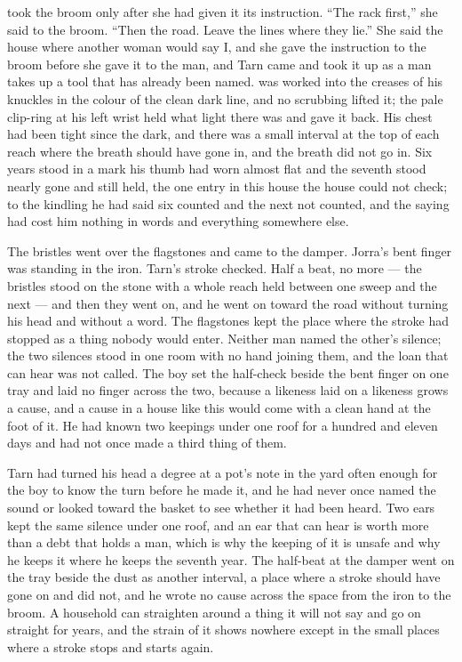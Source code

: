  took the broom only after she had given it its instruction. “The rack first,” she said to the broom. “Then the road. Leave the lines where they lie.” She said the house where another woman would say I, and she gave the instruction to the broom before she gave it to the man, and Tarn came and took it up as a man takes up a tool that has already been named.  was worked into the creases of his knuckles in the colour of the clean dark line, and no scrubbing lifted it; the pale clip-ring at his left wrist held what light there was and gave it back. His chest had been tight since the dark, and there was a small interval at the top of each reach where the breath should have gone in, and the breath did not go in. Six years stood in a mark his thumb had worn almost flat and the seventh stood nearly gone and still held, the one entry in this house the house could not check; to the kindling he had said six counted and the next not counted, and the saying had cost him nothing in words and everything somewhere else.

The bristles went over the flagstones and came to the damper. Jorra's bent finger was standing in the iron. Tarn's stroke checked. Half a beat, no more --- the bristles stood on the stone with a whole reach held between one sweep and the next --- and then they went on, and he went on toward the road without turning his head and without a word. The flagstones kept the place where the stroke had stopped as a thing nobody would enter. Neither man named the other's silence; the two silences stood in one room with no hand joining them, and the loan that can hear was not called. The boy set the half-check beside the bent finger on one tray and laid no finger across the two, because a likeness laid on a likeness grows a cause, and a cause in a house like this would come with a clean hand at the foot of it. He had known two keepings under one roof for a hundred and eleven days and had not once made a third thing of them.

Tarn had turned his head a degree at a pot's note in the yard often enough for the boy to know the turn before he made it, and he had never once named the sound or looked toward the basket to see whether it had been heard. Two ears kept the same silence under one roof, and an ear that can hear is worth more than a debt that holds a man, which is why the keeping of it is unsafe and why he keeps it where he keeps the seventh year. The half-beat at the damper went on the tray beside the dust as another interval, a place where a stroke should have gone on and did not, and he wrote no cause across the space from the iron to the broom. A household can straighten around a thing it will not say and go on straight for years, and the strain of it shows nowhere except in the small places where a stroke stops and starts again.

